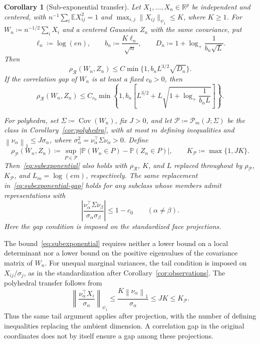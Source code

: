 \documentclass[11pt,letterpaper]{article}
\newtheorem{corollary}{Corollary}
\theoremstyle{remark}
\newcommand{\E}{\mathbb E}
\newcommand{\Pp}{\mathbb P}
\newcommand{\R}{\mathbb R}
\newcommand{\Cov}{\operatorname{Cov}}
\newcommand{\norm}[1]{\left\lVert#1\right\rVert}
\newcommand{\rh}{\rho_{\mathcal R}}
\begin{document}
\begin{corollary}[Sub-exponential transfer]\label{cor:subexponential}
Let \(X_1,\ldots,X_n\in\R^p\) be independent and centered, with
\(n^{-1}\sum_i\E X_{ij}^2=1\) and
\(\max_{i,j}\|X_{ij}\|_{\psi_1}\le K\), where \(K\ge1\).
For \(W_n\coloneqq n^{-1/2}\sum_iX_i\) and a centered Gaussian \(Z_n\)
with the same covariance, put
\[
 \ell_n\coloneqq \log(en),\qquad b_n\coloneqq \frac{K\ell_n}{\sqrt n},\qquad
 D_n\coloneqq 1+\log_+\frac1{b_n\sqrt L}.
\]
Then
\begin{equation}
 \rh(W_n,Z_n)\le C\min\{1,b_nL^{3/2}\sqrt{D_n}\}.
 \label{eq:subexponential}
\end{equation}
If the correlation gap of \(W_n\) is at least a fixed \(c_0>0\), then
\begin{equation}
 \rh(W_n,Z_n)\le C_{c_0}\min\!\left\{1,
 b_n\left[L^{3/2}+L\sqrt{1+\log_+\frac1{b_nL}}\right]\right\}.
 \label{eq:subexponential-gap}
\end{equation}

For polyhedra, set \(\Sigma\coloneqq\Cov(W_n)\), fix \(J>0\), and
let \(\mathcal P\coloneqq\mathcal P_m(J;\Sigma)\) be the class in
Corollary~\ref{cor:polyhedra}, with at most \(m\) defining inequalities
and \(\norm{\nu_\alpha}_1\le J\sigma_\alpha\), where
\(\sigma_\alpha^2=\nu_\alpha^\top\Sigma\nu_\alpha>0\). Define
\[
 \rho_{\mathcal P}(W_n,Z_n)\coloneqq
 \sup_{P\in\mathcal P}|\Pp(W_n\in P)-\Pp(Z_n\in P)|,
 \qquad K_{\mathcal P}\coloneqq\max\{1,JK\}.
\]
Then~\eqref{eq:subexponential} also holds with
\(\rh\), \(K\), and \(L\) replaced throughout by
\(\rho_{\mathcal P}\), \(K_{\mathcal P}\), and
\(L_m=\log(em)\), respectively. The same replacement
in~\eqref{eq:subexponential-gap} holds for any subclass whose members
admit representations with
\[
 \left|\frac{\nu_\alpha^\top\Sigma\nu_\beta}
 {\sigma_\alpha\sigma_\beta}\right|\le1-c_0
 \qquad(\alpha\ne\beta).
\]
Here the gap condition is imposed on the standardized face projections.
\end{corollary}

The bound~\eqref{eq:subexponential} requires neither a lower bound on a
local determinant nor a lower bound on the positive eigenvalues of the
covariance matrix of \(W_n\). For unequal marginal variances, the tail
condition is imposed on \(X_{ij}/\sigma_j\), as in the standardization after
Corollary~\ref{cor:observations}. The polyhedral transfer follows from
\[
 \left\|\frac{\nu_\alpha^\top X_i}{\sigma_\alpha}\right\|_{\psi_1}
 \le \frac{K\norm{\nu_\alpha}_1}{\sigma_\alpha}
 \le JK\le K_{\mathcal P}.
\]
Thus the same tail argument applies after projection, with the number
of defining inequalities replacing the ambient dimension. A correlation
gap in the original coordinates does not by itself ensure a gap among
these projections.
\end{document}
